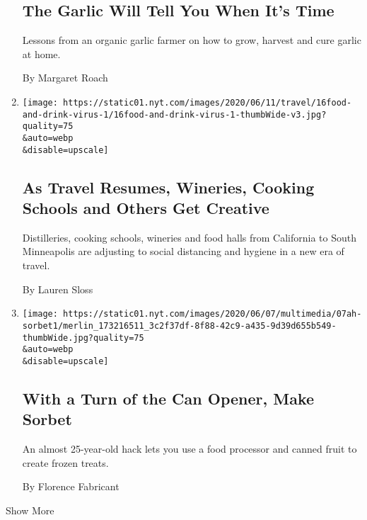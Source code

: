 \begin{enumerate}
  \hypertarget{the-garlic-will-tell-you-when-its-time}{%
  \subsection{The Garlic Will Tell You When It's
  Time}\label{the-garlic-will-tell-you-when-its-time}}

  Lessons from an organic garlic farmer on how to grow, harvest and cure
  garlic at home.

  By Margaret Roach
\item
  \href{/2020/06/16/travel/wineries-distilleries-farm-stay-cooking-schools-virus.html}{}

  \texttt{[image: https://static01.nyt.com/images/2020/06/11/travel/16food-and-drink-virus-1/16food-and-drink-virus-1-thumbWide-v3.jpg?quality=75\\\&auto=webp\\\&disable=upscale]}

  \hypertarget{as-travel-resumes-wineries-cooking-schools-and-others-get-creative}{%
  \subsection{As Travel Resumes, Wineries, Cooking Schools and Others
  Get
  Creative}\label{as-travel-resumes-wineries-cooking-schools-and-others-get-creative}}

  Distilleries, cooking schools, wineries and food halls from California
  to South Minneapolis are adjusting to social distancing and hygiene in
  a new era of travel.

  By Lauren Sloss
\item
  \href{/2020/06/05/at-home/how-to-make-sorbet.html}{}

  \texttt{[image: https://static01.nyt.com/images/2020/06/07/multimedia/07ah-sorbet1/merlin\_173216511\_3c2f37df-8f88-42c9-a435-9d39d655b549-thumbWide.jpg?quality=75\\\&auto=webp\\\&disable=upscale]}

  \hypertarget{with-a-turn-of-the-can-opener-make-sorbet}{%
  \subsection{With a Turn of the Can Opener, Make
  Sorbet}\label{with-a-turn-of-the-can-opener-make-sorbet}}

  An almost 25-year-old hack lets you use a food processor and canned
  fruit to create frozen treats.

  By Florence Fabricant
\end{enumerate}

Show More

